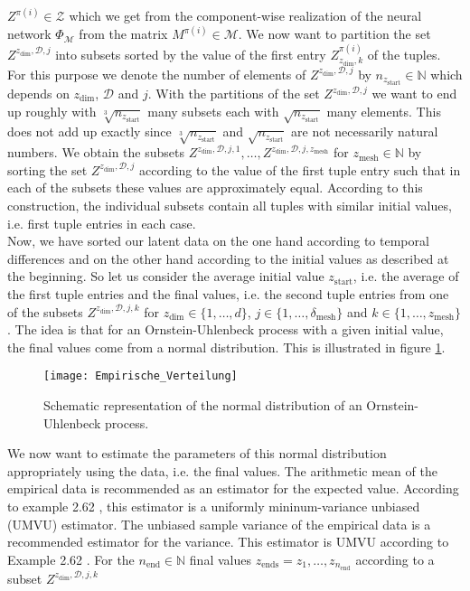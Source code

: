 \documentclass[11pt,titlepage]{article}
\newcommand{\N}{\mathbb{N}} %
\theoremstyle{definition}
\theoremstyle{remark}
\begin{document}
	$Z^{\pi(i)}\in\mathcal{Z}$ which we get from the component-wise realization of the neural network $\Phi_\mathcal{M}$ from the matrix $M^{\pi(i)}\in\mathcal{M}$. We now want to partition the set $Z^{z_\mathrm{dim},\mathcal{D},j}$ into subsets sorted by the value of the first entry $Z_{z_\mathrm{dim},k}^{\pi(i)}$ of the tuples. For this purpose we denote the number of elements of $Z^{z_\mathrm{dim},\mathcal{D},j}$ by $n_{z_\mathrm{start}}\in\N$ which depends on $z_\mathrm{dim}$, $\mathcal{D}$ and $j$. With the partitions of the set $Z^{z_\mathrm{dim},\mathcal{D},j}$ we want to end up roughly with  $\sqrt[3]{n_{z_\mathrm{start}}}$ many subsets each with $\sqrt{n_{z_\mathrm{start}}}$ many elements. This does not add up exactly since $\sqrt[3]{n_{z_\mathrm{start}}}$ and $\sqrt{n_{z_\mathrm{start}}}$ are not necessarily natural numbers.
	We obtain the subsets $Z^{z_\mathrm{dim},\mathcal{D},j,1},\ldots, Z^{z_\mathrm{dim},\mathcal{D},j,z_\mathrm{mesh}}$ for $z_\mathrm{mesh}\in\N$ by sorting the set $Z^{z_\mathrm{dim},\mathcal{D},j}$ according to the value of the first tuple entry such that in each of the subsets these values are approximately equal. According to this construction, the individual subsets contain all tuples with similar initial values, i.e. first tuple entries in each case. \\
	Now, we have sorted our latent data on the one hand according to temporal differences and on the other hand according to the initial values as described at the beginning. So let us consider the average initial value $z_\mathrm{start}$, i.e. the average of the first tuple entries and the final values, i.e. the second tuple entries from one of the subsets $Z^{z_\mathrm{dim},\mathcal{D},j, k}$ for $z_\mathrm{dim}\in\{1,\ldots,d\}$, $j\in\{1,\ldots,\delta_\mathrm{mesh}\}$ and $k\in\{1,\ldots,z_\mathrm{mesh}\}$. The idea is that for an Ornstein-Uhlenbeck process with a given initial value, the final values come from a normal distribution. This is illustrated in figure \ref{Abb Empirische Verteilung}.\\
	\begin{figure}[h!]
		\centering
		\texttt{[image: Empirische\_Verteilung]}
		\caption{Schematic representation of the normal distribution of an Ornstein-Uhlenbeck process.}
		\label{Abb Empirische Verteilung}
	\end{figure}
	We now want to estimate the parameters of this normal distribution appropriately using the data, i.e. the final values. The arithmetic mean of the empirical data is recommended as an estimator for the expected value. According to example 2.62 \cite{Hammerstein2021}, this estimator is a uniformly mininum-variance unbiased (UMVU) estimator. The unbiased sample variance of the empirical data is a recommended estimator for the variance. This estimator is UMVU according to Example 2.62 \cite{Hammerstein2021}. For the $n_\mathrm{end}\in\N$ final values $z_\mathrm{ends} =z_1,\ldots, z_{n_\mathrm{end}}$ according to a subset $Z^{z_\mathrm{dim},\mathcal{D},j,k}$ 
\end{document}
